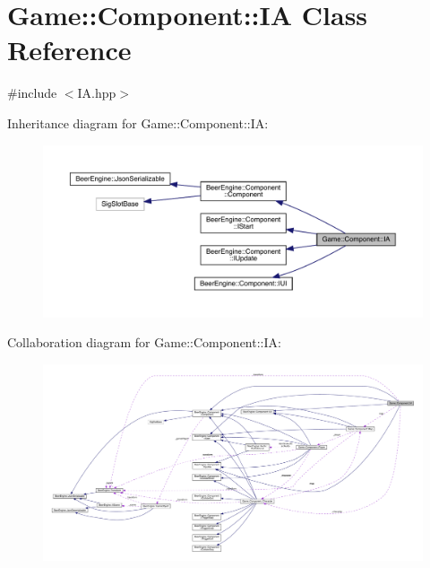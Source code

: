 \hypertarget{class_game_1_1_component_1_1_i_a}{}\section{Game\+:\+:Component\+:\+:IA Class Reference}
\label{class_game_1_1_component_1_1_i_a}


{\ttfamily \#include $<$I\+A.\+hpp$>$}



Inheritance diagram for Game\+:\+:Component\+:\+:IA\+:
\nopagebreak
\begin{figure}[H]
\begin{center}
\leavevmode
\includegraphics[width=350pt]{class_game_1_1_component_1_1_i_a__inherit__graph}
\end{center}
\end{figure}


Collaboration diagram for Game\+:\+:Component\+:\+:IA\+:
\nopagebreak
\begin{figure}[H]
\begin{center}
\leavevmode
\includegraphics[width=350pt]{class_game_1_1_component_1_1_i_a__coll__graph}
\end{center}
\end{figure}
